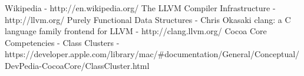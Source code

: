 \documentclass[a4paper,11pt]{article}
\begin{document}
\begin{thebibliography}{9}
	 Wikipedia - http://en.wikipedia.org/
	 The LLVM Compiler Infrastructure - http://llvm.org/
	 Purely Functional Data Structures - Chris Okasaki
	 clang: a C language family frontend for LLVM - http://clang.llvm.org/
	 Cocoa Core Competencies - Class Clusters - \\
		https://developer.apple.com/library/mac/\#documentation/General/Conceptual/DevPedia-CocoaCore/ClassCluster.html
\end{thebibliography}
\end{document}
